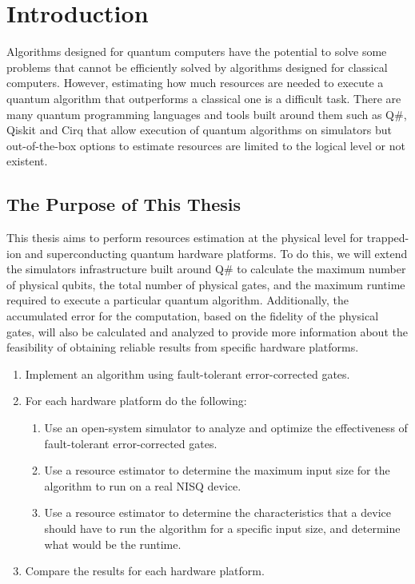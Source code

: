%
%
\chapter {Introduction}

Algorithms designed for quantum computers have the potential to solve some problems that cannot be efficiently solved by algorithms designed for classical computers. However, estimating how much resources are needed to execute a quantum algorithm that outperforms a classical one is a difficult task. There are many quantum programming languages and tools built around them such as Q\#\cite{QSharp_Svore_2018}, Qiskit\cite{Qiskit_2021} and Cirq\cite{Cirq_2021} that allow execution of quantum algorithms on simulators but out-of-the-box options to estimate resources are limited to the logical level or not existent.

\section{The Purpose of This Thesis}

This thesis aims to perform resources estimation at the physical level for trapped-ion and superconducting quantum hardware platforms. To do this, we will extend the simulators infrastructure built around Q\# to calculate the maximum number of physical qubits, the total number of physical gates, and the maximum runtime required to execute a particular quantum algorithm. Additionally, the accumulated error for the computation, based on the fidelity of the physical gates, will also be calculated and analyzed to provide more information about the feasibility of obtaining reliable results from specific hardware platforms.


\begin{enumerate}
    \item Implement an algorithm using fault-tolerant error-corrected gates.
    \item For each hardware platform do the following:
    \begin{enumerate}
        \item Use an open-system simulator to analyze and optimize the effectiveness of fault-tolerant error-corrected gates.
        \item Use a resource estimator to determine the maximum input size for the algorithm to run on a real NISQ device.
        \item Use a resource estimator to determine the characteristics that a device should have to run the algorithm for a specific input size, and determine what would be the runtime.
    \end{enumerate}
    \item Compare the results for each hardware platform.
\end{enumerate}

